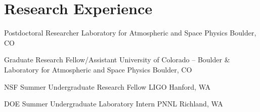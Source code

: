 \section{Research Experience}


		{Postdoctoral Researcher}
		{Laboratory for Atmospheric and Space Physics}
		{Boulder, CO}
		{}
		{}


		{Graduate Research Fellow/Assistant}
		{University of Colorado -- Boulder \& Laboratory for Atmospheric and Space Physics}
		{Boulder, CO}
		{}
		{}

		{NSF Summer Undergraduate Research Fellow}
		{LIGO}
		{Hanford, WA}
		{}
		{}

		{DOE Summer Undergraduate Laboratory Intern}
		{PNNL}
		{Richland, WA}
		{}
		{}
